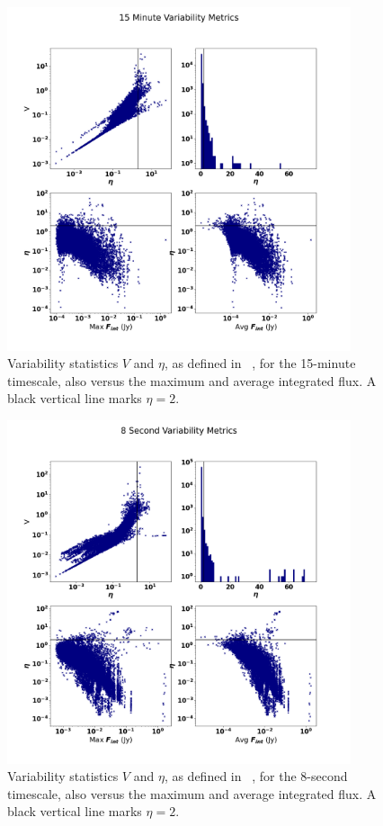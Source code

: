 \documentclass[12pt]{article}
\begin{document}
\begin{figure}
	\includegraphics[width=0.9\textwidth]{15_Minute_Variability_Metrics.png}
	\caption{Variability statistics $V$ and $\eta$, as defined in ~\citet{2015A&C....11...25S}, for the 15-minute timescale, also versus the maximum and average integrated flux. A black vertical line marks $\eta=2$.}
	\label{fig:varstat15min}
\end{figure}

\begin{figure}
	\includegraphics[width=0.9\textwidth]{8_Second_Variability_Metrics.png}
	\caption{Variability statistics $V$ and $\eta$, as defined in ~\citet{2015A&C....11...25S}, for the 8-second timescale, also versus the maximum and average integrated flux. A black vertical line marks $\eta=2$.}
	\label{fig:varstat8sec}
\end{figure}
\end{document}
